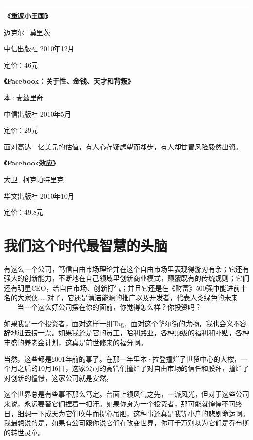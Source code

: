 \begin{center}\rule{0.5\linewidth}{0.5pt}\end{center}

\textbf{《重返小王国》}

迈克尔·莫里茨

中信出版社 2010年12月

定价：46元

\textbf{《Facebook：关于性、金钱、天才和背叛》}

本·麦兹里奇

中信出版社 2010年5月

定价：29元

面对高达一亿美元的估值，有人心存疑虑望而却步，有人却甘冒风险毅然出资。

\textbf{《Facebook效应》}

大卫·柯克帕特里克

华文出版社 2010年10月

定价：49.8元

\hypertarget{ux6211ux4eecux8fd9ux4e2aux65f6ux4ee3ux6700ux667aux6167ux7684ux5934ux8111}{%
\section{我们这个时代最智慧的头脑}\label{ux6211ux4eecux8fd9ux4e2aux65f6ux4ee3ux6700ux667aux6167ux7684ux5934ux8111}}

有这么一个公司，笃信自由市场理论并在这个自由市场里表现得游刃有余；它还有强大的创新能力，不断地在自己领域里创新商业模式，颠覆既有的传统规则；它们还有明星CEO，给自由市场、创新打气；并且它还是在《财富》500强中能进前十名的大家伙\ldots\ldots 对了，它还是清洁能源的推广以及开发者，代表人类绿色的未来------当一个这么好公司摆在你的面前，你觉得怎么样？你投资吗？

如果我是一个投资者，面对这样一组Tag，面对这个华尔街的尤物，我也会义不容辞地进去捞一票。如果我还是它的员工，哈利路亚，各种顶级的福利和补贴，各种丰盛的养老金计划，这真是前世修来的福分啊。

当然，这些都是2001年前的事了。在那一年里本·拉登撞烂了世贸中心的大楼，一个月之后的10月16日，这家公司的高管们撞烂了对自由市场的信任和膜拜，撞烂了对创新的憧憬，这家公司就是安然。

这个世界总是有些事不那么笃定。台面上领风气之先，一派风光，但对于这些公司来说，永远要替它们捏着一把汗。如果你身为一个投资者，那可能就惶惶不可终日，细想一下成天为它们吹牛而提心吊胆，这种事还真是我等小户的悲剧命运啊。我最想说的是，如果有公司跟你说它们在改变世界，你可千万别以为它们是乔布斯的转世灵童。

